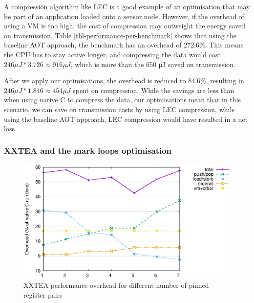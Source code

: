 A compression algorithm like LEC is a good example of an optimisation that may be part of an application loaded onto a sensor node. However, if the overhead of using a VM is too high, the cost of compression may outweight the energy saved on transmission. Table \ref{tbl-performance-per-benchmark} shows that using the baseline AOT approach, the  benchmark has an overhead of 272.6\%. This means the CPU has to stay active longer, and compressing the data would cost $246 \mu J * 3.726 \approx 916 \mu J$, which is more than the 650 μJ saved on transmission.

After we apply our optimisations, the overhead is reduced to 84.6\%, resulting in $246 \mu J * 1.846 \approx 454 \mu J$ spent on compression. While the savings are less than when using native C to compress the data, our optimisations mean that in this scenario, we can save on transmission costs by using LEC compression, while using the baseline AOT approach, LEC compression would have resulted in a net loss.

\subsubsection{XXTEA and the mark loops optimisation}

\begin{figure}
\centering
\includegraphics[width=\mygraphsize]{pinnedregs-performance-xxtea.eps}
\caption{XXTEA performance overhead for different number of pinned register pairs}
\label{fig-performance-pinnedregs-xxtea-per-opcode-category}
\end{figure}

